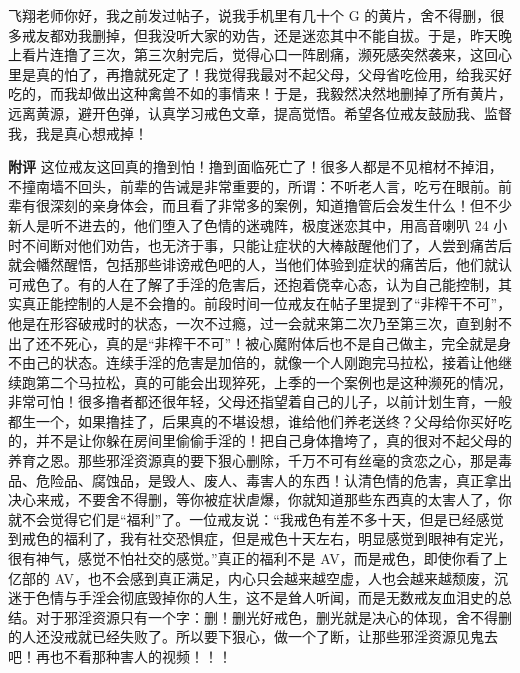 \begin{case}
    飞翔老师你好，我之前发过帖子，说我手机里有几十个 G 的黄片，舍不得删，很多戒友都劝我删掉，但我没听大家的劝告，还是迷恋其中不能自拔。于是，昨天晚上看片连撸了三次，第三次射完后，觉得心口一阵剧痛，濒死感突然袭来，这回心里是真的怕了，再撸就死定了！我觉得我最对不起父母，父母省吃俭用，给我买好吃的，而我却做出这种禽兽不如的事情来！于是，我毅然决然地删掉了所有黄片，远离黄源，避开色弹，认真学习戒色文章，提高觉悟。希望各位戒友鼓励我、监督我，我是真心想戒掉！

    \textbf{附评} 这位戒友这回真的撸到怕！撸到面临死亡了！很多人都是不见棺材不掉泪，不撞南墙不回头，前辈的告诫是非常重要的，所谓：不听老人言，吃亏在眼前。前辈有很深刻的亲身体会，而且看了非常多的案例，知道撸管后会发生什么！但不少新人是听不进去的，他们堕入了色情的迷魂阵，极度迷恋其中，用高音喇叭 24 小时不间断对他们劝告，也无济于事，只能让症状的大棒敲醒他们了，人尝到痛苦后就会幡然醒悟，包括那些诽谤戒色吧的人，当他们体验到症状的痛苦后，他们就认可戒色了。有的人在了解了手淫的危害后，还抱着侥幸心态，认为自己能控制，其实真正能控制的人是不会撸的。前段时间一位戒友在帖子里提到了“非榨干不可”，他是在形容破戒时的状态，一次不过瘾，过一会就来第二次乃至第三次，直到射不出了还不死心，真的是“非榨干不可”！被心魔附体后也不是自己做主，完全就是身不由己的状态。连续手淫的危害是加倍的，就像一个人刚跑完马拉松，接着让他继续跑第二个马拉松，真的可能会出现猝死，上季的一个案例也是这种濒死的情况，非常可怕！很多撸者都还很年轻，父母还指望着自己的儿子，以前计划生育，一般都生一个，如果撸挂了，后果真的不堪设想，谁给他们养老送终？父母给你买好吃的，并不是让你躲在房间里偷偷手淫的！把自己身体撸垮了，真的很对不起父母的养育之恩。那些邪淫资源真的要下狠心删除，千万不可有丝毫的贪恋之心，那是毒品、危险品、腐蚀品，是毁人、废人、毒害人的东西！认清色情的危害，真正拿出决心来戒，不要舍不得删，等你被症状虐爆，你就知道那些东西真的太害人了，你就不会觉得它们是“福利”了。一位戒友说：“我戒色有差不多十天，但是已经感觉到戒色的福利了，我有社交恐惧症，但是戒色十天左右，明显感觉到眼神有定光，很有神气，感觉不怕社交的感觉。”真正的福利不是 AV，而是戒色，即使你看了上亿部的 AV，也不会感到真正满足，内心只会越来越空虚，人也会越来越颓废，沉迷于色情与手淫会彻底毁掉你的人生，这不是耸人听闻，而是无数戒友血泪史的总结。对于邪淫资源只有一个字：删！删光好戒色，删光就是决心的体现，舍不得删的人还没戒就已经失败了。所以要下狠心，做一个了断，让那些邪淫资源见鬼去吧！再也不看那种害人的视频！！！
\end{case}

